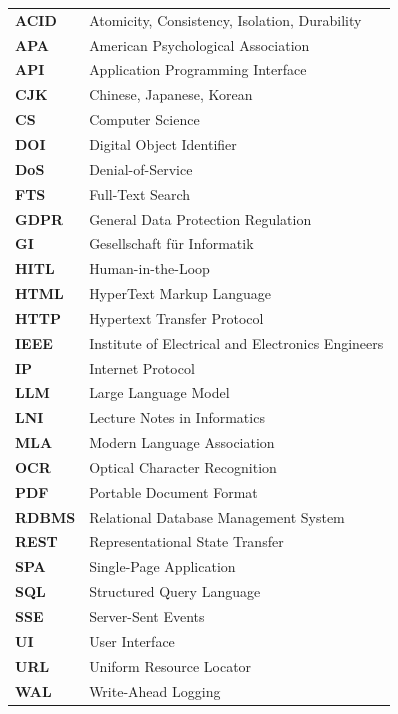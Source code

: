 \documentclass[12pt,a4paper,oneside]{report}
\begin{document}
\begingroup
\renewcommand{\arraystretch}{1.2}
\begin{longtable}{@{}p{3cm} l@{}}
\textbf{ACID}  & Atomicity, Consistency, Isolation, Durability \\
\textbf{APA}   & American Psychological Association \\
\textbf{API}   & Application Programming Interface \\
\textbf{CJK}   & Chinese, Japanese, Korean \\
\textbf{CS}    & Computer Science \\
\textbf{DOI}   & Digital Object Identifier \\
\textbf{DoS}   & Denial-of-Service \\
\textbf{FTS}   & Full-Text Search \\
\textbf{GDPR}  & General Data Protection Regulation \\
\textbf{GI}    & Gesellschaft für Informatik \\
\textbf{HITL}  & Human-in-the-Loop \\
\textbf{HTML}  & HyperText Markup Language \\
\textbf{HTTP}  & Hypertext Transfer Protocol \\
\textbf{IEEE}  & Institute of Electrical and Electronics Engineers \\
\textbf{IP}    & Internet Protocol \\
\textbf{LLM}   & Large Language Model \\
\textbf{LNI}   & Lecture Notes in Informatics \\
\textbf{MLA}   & Modern Language Association \\
\textbf{OCR}   & Optical Character Recognition \\
\textbf{PDF}   & Portable Document Format \\
\textbf{RDBMS} & Relational Database Management System \\
\textbf{REST}  & Representational State Transfer \\
\textbf{SPA}   & Single-Page Application \\
\textbf{SQL}   & Structured Query Language \\
\textbf{SSE}   & Server-Sent Events \\
\textbf{UI}    & User Interface \\
\textbf{URL}   & Uniform Resource Locator \\
\textbf{WAL}   & Write-Ahead Logging \\
\end{longtable}
\endgroup
\end{document}
